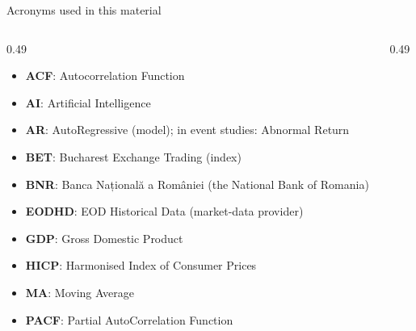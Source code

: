 {
\begin{frame}[noframenumbering]
    \titlepage
\end{frame}
}
\begin{frame}{Acronyms used in this material}
\begin{columns}[T]
\begin{column}{0.49\textwidth}
\begin{itemize}\setlength{\itemsep}{0pt}
    \item \textbf{ACF}: Autocorrelation Function
    \item \textbf{AI}: Artificial Intelligence
    \item \textbf{AR}: AutoRegressive (model); in event studies: Abnormal Return
    \item \textbf{BET}: Bucharest Exchange Trading (index)
    \item \textbf{BNR}: Banca Națională a României (the National Bank of Romania)
    \item \textbf{EODHD}: EOD Historical Data (market-data provider)
    \item \textbf{GDP}: Gross Domestic Product
    \item \textbf{HICP}: Harmonised Index of Consumer Prices
    \item \textbf{MA}: Moving Average
    \item \textbf{PACF}: Partial AutoCorrelation Function
\end{itemize}
\end{column}
\begin{column}{0.49\textwidth}
\end{column}
\end{columns}
\end{frame}

